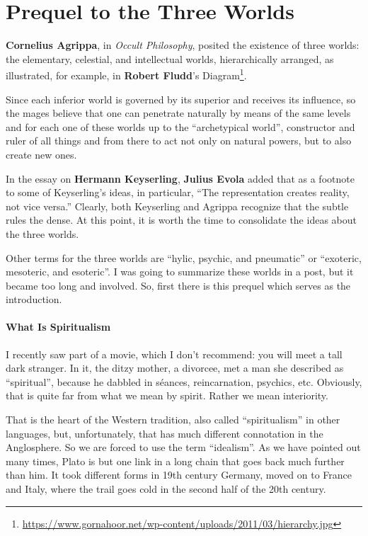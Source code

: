 \section{Prequel to the Three Worlds}

\textbf{Cornelius Agrippa}, in \emph{Occult Philosophy}, posited the existence of three worlds: the elementary, celestial, and intellectual worlds, hierarchically arranged, as illustrated, for example, in \textbf{Robert Fludd}’s Diagram\footnote{\url{https://www.gornahoor.net/wp-content/uploads/2011/03/hierarchy.jpg}}.

\begin{quotex}
Since each inferior world is governed by its superior and receives its influence, so the mages believe that one can penetrate naturally by means of the same levels and for each one of these worlds up to the “archetypical world”, constructor and ruler of all things and from there to act not only on natural powers, but to also create new ones.

\end{quotex}
In the essay on \textbf{Hermann Keyserling}, \textbf{Julius Evola} added that as a footnote to some of Keyserling’s ideas, in particular, “The representation creates reality, not vice versa.” Clearly, both Keyserling and Agrippa recognize that the subtle rules the dense. At this point, it is worth the time to consolidate the ideas about the three worlds.

Other terms for the three worlds are “hylic, psychic, and pneumatic” or “exoteric, mesoteric, and esoteric”. I was going to summarize these worlds in a post, but it became too long and involved. So, first there is this prequel which serves as the introduction.

\paragraph{What Is Spiritualism}
I recently saw part of a movie, which I don’t recommend: you will meet a tall dark stranger. In it, the ditzy mother, a divorcee, met a man she described as “spiritual”, because he dabbled in séances, reincarnation, psychics, etc. Obviously, that is quite far from what we mean by spirit. Rather we mean interiority.

That is the heart of the Western tradition, also called “spiritualism” in other languages, but, unfortunately, that has much different connotation in the Anglosphere. So we are forced to use the term “idealism”. As we have pointed out many times, Plato is but one link in a long chain that goes back much further than him. It took different forms in 19th century Germany, moved on to France and Italy, where the trail goes cold in the second half of the 20th century.

